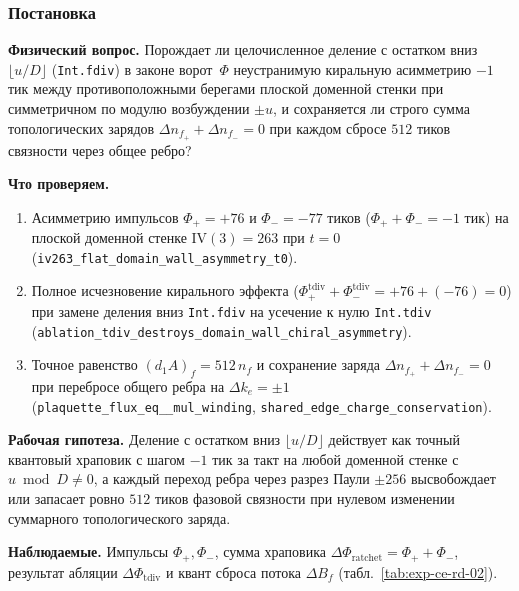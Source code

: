 \label{exp:cerd02}

\subsubsection*{Постановка}
\textbf{Физический вопрос.}
Порождает ли целочисленное деление с остатком вниз $\lfloor u/D\rfloor$ (\texttt{Int.fdiv}) в законе ворот~$\Phi$ неустранимую киральную асимметрию $-1$ тик между противоположными берегами плоской доменной стенки при симметричном по модулю возбуждении $\pm u$, и сохраняется ли строго сумма топологических зарядов $\Delta n_{f_+} + \Delta n_{f_-} = 0$ при каждом сбросе $512$ тиков связности через общее ребро?

\textbf{Что проверяем.}
\begin{enumerate}[label=\textbf{(\alph*)},leftmargin=*,itemsep=0.25em]
\item Асимметрию импульсов $\Phi_+ = +76$ и $\Phi_- = -77$ тиков ($\Phi_+ + \Phi_- = -1$ тик) на плоской доменной стенке $\mathrm{IV}(3)=263$ при $t=0$ (\texttt{iv263\_\allowbreak flat\_\allowbreak domain\_\allowbreak wall\_\allowbreak asymmetry\_\allowbreak t0}).
\item Полное исчезновение кирального эффекта ($\Phi_+^{\mathrm{tdiv}} + \Phi_-^{\mathrm{tdiv}} = +76 + (-76) = 0$) при замене деления вниз \texttt{Int.fdiv} на усечение к нулю \texttt{Int.tdiv} (\texttt{ablation\_\allowbreak tdiv\_\allowbreak destroys\_\allowbreak domain\_\allowbreak wall\_\allowbreak chiral\_\allowbreak asymmetry}).
\item Точное равенство $(d_1 A)_f = 512\,n_f$ и сохранение заряда $\Delta n_{f_+} + \Delta n_{f_-} = 0$ при перебросе общего ребра на $\Delta k_e = \pm 1$ (\texttt{plaquette\_\allowbreak flux\_\allowbreak eq\_\_\allowbreak mul\_\allowbreak winding}, \texttt{shared\_\allowbreak edge\_\allowbreak charge\_\allowbreak conservation}).
\end{enumerate}

\textbf{Рабочая гипотеза.}
Деление с остатком вниз $\lfloor u/D\rfloor$ действует как точный квантовый храповик с шагом $-1$ тик за такт на любой доменной стенке с $u\bmod D\ne 0$, а каждый переход ребра через разрез Паули $\pm 256$ высвобождает или запасает ровно $512$ тиков фазовой связности при нулевом изменении суммарного топологического заряда.

\textbf{Наблюдаемые.}
Импульсы $\Phi_+, \Phi_-$, сумма храповика $\Delta\Phi_{\mathrm{ratchet}} = \Phi_+ + \Phi_-$, результат абляции $\Delta\Phi_{\mathrm{tdiv}}$ и квант сброса потока $\Delta B_f$ (табл.~\ref{tab:exp-ce-rd-02}).

